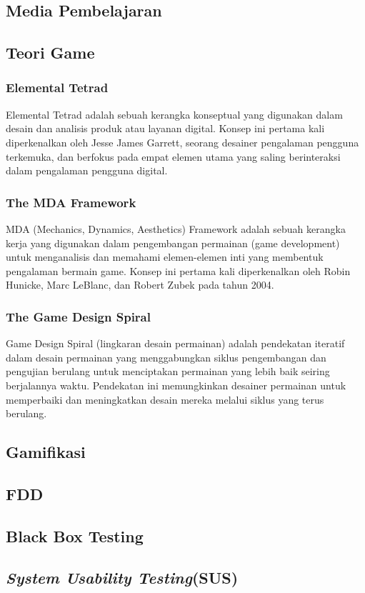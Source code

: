 \subsection{Media Pembelajaran}
\subsection{Teori Game}
\subsubsection{Elemental Tetrad} 
Elemental Tetrad adalah sebuah kerangka konseptual yang digunakan dalam desain dan analisis produk atau layanan digital. 
Konsep ini pertama kali diperkenalkan oleh Jesse James Garrett, seorang desainer pengalaman pengguna terkemuka, 
dan berfokus pada empat elemen utama yang saling berinteraksi dalam pengalaman pengguna digital.

\subsubsection{The MDA Framework}
MDA (Mechanics, Dynamics, Aesthetics) Framework adalah sebuah kerangka kerja yang digunakan dalam pengembangan permainan
(game development) untuk menganalisis dan memahami elemen-elemen inti yang membentuk pengalaman bermain game. 
Konsep ini pertama kali diperkenalkan oleh Robin Hunicke, Marc LeBlanc, dan Robert Zubek pada tahun 2004.
\subsubsection{The Game Design Spiral}
Game Design Spiral (lingkaran desain permainan) adalah pendekatan iteratif 
dalam desain permainan yang menggabungkan siklus pengembangan dan pengujian berulang untuk menciptakan 
permainan yang lebih baik seiring berjalannya waktu. Pendekatan ini memungkinkan desainer permainan untuk 
memperbaiki dan meningkatkan desain mereka melalui siklus yang terus berulang.
\subsection{Gamifikasi}
\subsection{FDD}
\subsection{Black Box Testing}
\subsection{\textit{System Usability Testing}(SUS)}
